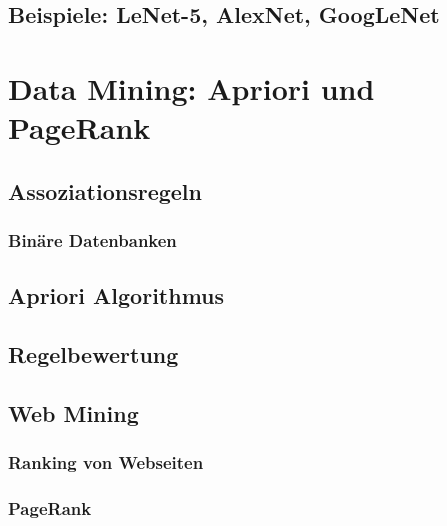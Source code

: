 	\section{Beispiele: LeNet-5, AlexNet, GoogLeNet} %

\chapter{Data Mining: Apriori und PageRank} %

	\section{Assoziationsregeln} %

		\subsection{Binäre Datenbanken} %

	\section{Apriori Algorithmus} %

	\section{Regelbewertung} %

	\section{Web Mining} %

		\subsection{Ranking von Webseiten} %

		\subsection{PageRank} %
